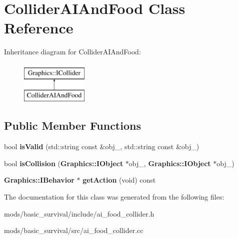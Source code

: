 \section{Collider\+A\+I\+And\+Food Class Reference}
\label{class_collider_a_i_and_food}
Inheritance diagram for Collider\+A\+I\+And\+Food\+:\begin{figure}[H]
\begin{center}
\leavevmode
\includegraphics[height=2.000000cm]{class_collider_a_i_and_food}
\end{center}
\end{figure}
\subsection*{Public Member Functions}
\begin{DoxyCompactItemize}
\item 
bool {\bfseries is\+Valid} (std\+::string const \&obj\+\_, std\+::string const \&obj\+\_)\label{class_collider_a_i_and_food_a5539e8ede36c8925761c9b38d72bb2f8}

\item 
bool {\bfseries is\+Collision} ({\bf Graphics\+::\+I\+Object} $\ast$obj\+\_, {\bf Graphics\+::\+I\+Object} $\ast$obj\+\_)\label{class_collider_a_i_and_food_a02da3d9f13b0266fd90e5d48ed0afb26}

\item 
{\bf Graphics\+::\+I\+Behavior} $\ast$ {\bfseries get\+Action} (void) const \label{class_collider_a_i_and_food_acdc9999cbb29add55cbeb09af00fa422}

\end{DoxyCompactItemize}


The documentation for this class was generated from the following files\+:\begin{DoxyCompactItemize}
\item 
mods/basic\+\_\+survival/include/ai\+\_\+food\+\_\+collider.\+h\item 
mods/basic\+\_\+survival/src/ai\+\_\+food\+\_\+collider.\+cc\end{DoxyCompactItemize}
